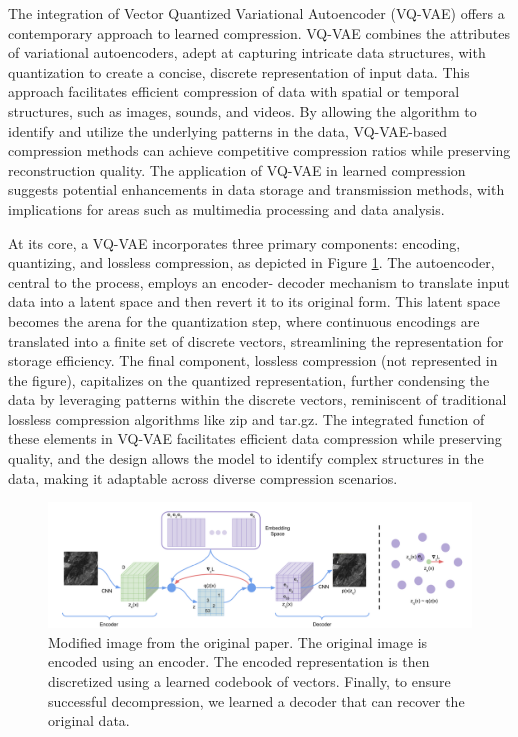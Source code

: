 \documentclass[runningheads]{llncs}
\begin{document}
The integration of Vector Quantized Variational Autoencoder (VQ-VAE)\cite{VQVAE} offers a contemporary
approach to learned compression. VQ-VAE combines the attributes of variational autoencoders, adept
at capturing intricate data structures, with quantization to create a concise, discrete representation
of input data. This approach facilitates efficient compression of data with spatial or temporal
structures, such as images, sounds, and videos. By allowing the algorithm to identify and utilize the
underlying patterns in the data, VQ-VAE-based compression methods can achieve competitive
compression ratios while preserving reconstruction quality. The application of VQ-VAE in learned
compression suggests potential enhancements in data storage and transmission methods, with
implications for areas such as multimedia processing and data analysis. 

At its core, a VQ-VAE incorporates three primary components: encoding, quantizing, and lossless compression,
as depicted in Figure \ref{fig-vqvae}. The autoencoder, central to the process, employs an encoder-
decoder mechanism to translate input data into a latent space and then revert it to its original form. 
This latent space becomes the arena for the quantization step, where continuous encodings are
translated into a finite set of discrete vectors, streamlining the representation for storage efficiency. 
The final component, lossless compression (not represented in the figure), capitalizes on the
quantized representation, further condensing the data by leveraging patterns within the discrete
vectors, reminiscent of traditional lossless compression algorithms like zip and tar.gz. The integrated
function of these elements in VQ-VAE facilitates efficient data compression while preserving quality, 
and the design allows the model to identify complex structures in the data, making it adaptable
across diverse compression scenarios. 

\begin{figure}
\includegraphics[width=\textwidth]{figures/VQVAE.png}
\caption{ Modified image from the original paper. The original image is encoded using an encoder. The encoded representation is 
then discretized using a learned codebook of vectors. Finally, to ensure successful decompression, we learned a decoder 
that can recover the original data.}
\label{fig-vqvae}
\end{figure}
 
\end{document}
